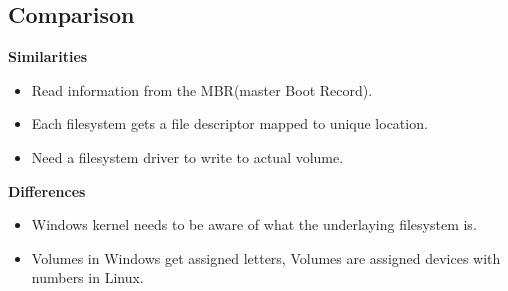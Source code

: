 \documentclass[letterpaper,10pt,notitlepage,fleqn]{article}
\begin{document}
\subsection*{Comparison}

\noindent \textbf{Similarities}\\
\begin{itemize}
    \item Read information from the MBR(master Boot Record).
    \item Each filesystem gets a file descriptor mapped to unique location.
    \item Need a filesystem driver to write to actual volume.
\end{itemize}
\noindent \textbf{Differences}\\
\begin{itemize}
    \item Windows kernel needs to be aware of what the underlaying filesystem is.
    \item Volumes in Windows get assigned letters, Volumes are assigned devices 
    with numbers in Linux.
\end{itemize}



\end{document}
